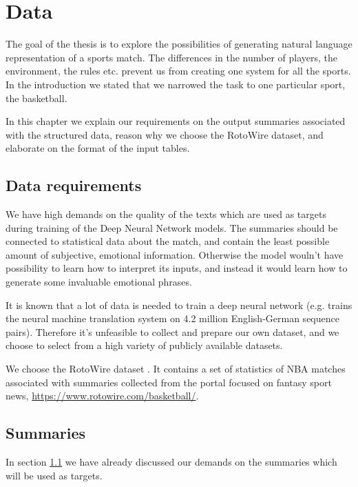 \chapter{Data} \label{chapter:data}

The goal of the thesis is to explore the possibilities of generating natural language representation of a sports match. The differences in the number of players, the environment, the rules etc. prevent us from creating one system for all the sports. In the introduction we stated that we narrowed the task to one particular sport, the basketball.

In this chapter we explain our requirements on the output summaries associated with the structured data, reason why we choose the RotoWire dataset, and elaborate on the format of the input tables.

\section{Data requirements} \label{section:data_requirements}

We have high demands on the quality of the texts which are used as targets during training of the Deep Neural Network models. The summaries should be connected to statistical data about the match, and contain the least possible amount of subjective, emotional information. Otherwise the model wouln't have possibility to learn how to interpret its inputs, and instead it would learn how to generate some invaluable emotional phrases.

It is known that a lot of data is needed to train a deep neural network (e.g. \citet{sennrich2016} trains the neural machine translation system on 4.2 million English-German sequence pairs). Therefore it's unfeasible to collect and prepare our own dataset, and we choose to select from a high variety of publicly available datasets.

We choose the RotoWire dataset \citep{wiseman2017}. It contains a set of statistics of NBA matches associated with summaries collected from the portal focused on fantasy sport news, \url{https://www.rotowire.com/basketball/}.

\section{Summaries}

In section \ref{section:data_requirements} we have already discussed our demands on the summaries which will be used as targets.

